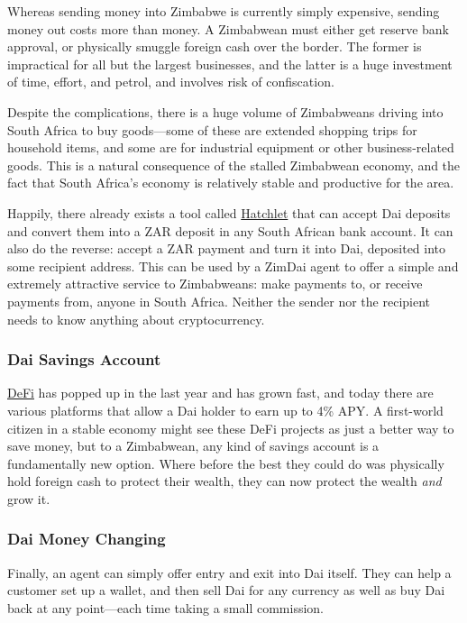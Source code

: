 \documentclass{article}
\begin{document}
Whereas sending money into Zimbabwe is currently simply expensive, sending money out costs more than money. A Zimbabwean must either get reserve bank approval, or physically smuggle foreign cash over the border. The former is impractical for all but the largest businesses, and the latter is a huge investment of time, effort, and petrol, and involves risk of confiscation.

Despite the complications, there is a huge volume of Zimbabweans driving into South Africa to buy goods---some of these are extended shopping trips for household items, and some are for industrial equipment or other business-related goods. This is a natural consequence of the stalled Zimbabwean economy, and the fact that South Africa's economy is relatively stable and productive for the area.

Happily, there already exists a tool called \href{https://hatchlet.co/}{Hatchlet} that can accept Dai deposits and convert them into a ZAR deposit in any South African bank account. It can also do the reverse: accept a ZAR payment and turn it into Dai, deposited into some recipient address. This can be used by a ZimDai agent to offer a simple and extremely attractive service to Zimbabweans: make payments to, or receive payments from, anyone in South Africa. Neither the sender nor the recipient needs to know anything about cryptocurrency.

\subsubsection{Dai Savings Account} \label{savings}

\href{https://blockonomi.com/what-is-decentralized-finance-defi/}{DeFi} has popped up in the last year and has grown fast, and today there are various platforms that allow a Dai holder to earn up to 4\% APY. A first-world citizen in a stable economy might see these DeFi projects as just a better way to save money, but to a Zimbabwean, any kind of savings account is a fundamentally new option. Where before the best they could do was physically hold foreign cash to protect their wealth, they can now protect the wealth \textit{and} grow it.

\subsubsection{Dai Money Changing} \label{dai money changing}

Finally, an agent can simply offer entry and exit into Dai itself. They can help a customer set up a wallet, and then sell Dai for any currency as well as buy Dai back at any point---each time taking a small commission.
\end{document}
